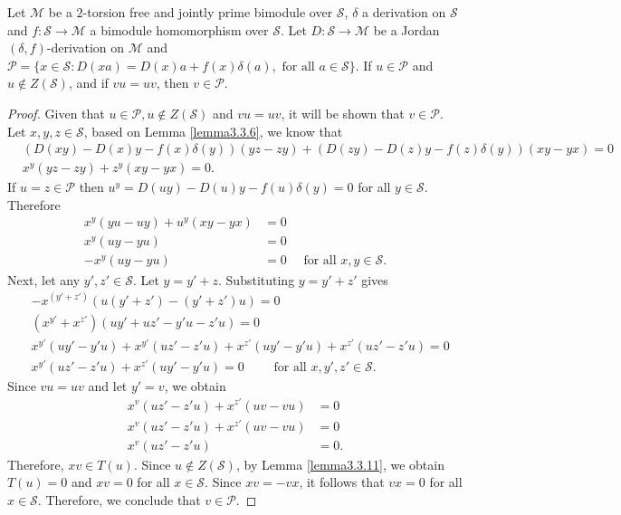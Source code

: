 \documentclass{arxiv}
\begin{document}
\begin{lemma}\label{lemma3.3.12}
    Let $\mathcal{M}$ be a $2$-torsion free and jointly prime bimodule over $\mathcal{S}$, $\delta$ a derivation on $\mathcal{S}$ and $f : \mathcal{S} \rightarrow \mathcal{M}$ a bimodule homomorphism over $\mathcal{S}$. Let $D:\mathcal{S} \rightarrow \mathcal{M}$ be a Jordan $(\delta,f)$-derivation on $\mathcal{M}$ and  $\mathcal{P}=\{ x \in \mathcal{S} : D(xa) = D(x)a+f(x)\delta(a), \text{ for all } a \in \mathcal{S}\}$. If $u \in \mathcal{P}$ and $u \notin Z(\mathcal{S})$, and if $vu=uv$, then $v \in \mathcal{P}$.
\end{lemma}
\begin{proof}
    Given that $u \in \mathcal{P}, u \notin Z(\mathcal{S})$ and $vu=uv$, it will be shown that $v \in \mathcal{P}$. Let $x,y,z \in \mathcal{S}$, based on Lemma \ref{lemma3.3.6}, we know that
    \begin{align*}
        & (D(xy)-D(x)y-f(x)\delta(y))(yz-zy)+(D(zy)-D(z)y-f(z)\delta(y))(xy-yx) = 0\\
        & x^y (yz-zy)+z^y (xy-yx)=0.
    \end{align*}
    If $u=z \in \mathcal{P}$ then $u^y = D(uy)-D(u)y -f(u)\delta(y) =0$ for all $y \in \mathcal{S}$. Therefore
    \begin{align*}
        x^y (yu-uy)+u^y(xy-yx)&=0\\
        x^y (uy-yu) &= 0 \\
        -x^y (uy-yu)&=0 \quad \text{ for all } x,y \in \mathcal{S}.
    \end{align*}
    Next, let any $y',z'\in \mathcal{S}$. Let $y=y'+z$. Substituting $y=y'+z'$ gives
    \begin{align*}
        &-x^{(y'+z')}(u(y'+z')-(y'+z')u) = 0\\
        &(x^{y'} + x^{z'})(uy'+uz'-y'u-z'u)=0\\
        &x^{y'}(uy'-y'u)+x^{y'}(uz'-z'u)+x^{z'}(uy'-y'u)+x^{z'}(uz'-z'u)=0\\
        &x^{y'}(uz'-z'u)+x^{z'}(uy'-y'u)=0 \quad \quad \text{ for all } x,y',z' \in \mathcal{S}.
    \end{align*}
    Since $vu=uv$ and let $y'=v$, we obtain
    \begin{align*}
        x^v (uz'-z'u)+x^{z'}(uv-vu) &=0\\
        x^v (uz'-z'u) + x^{z'}(uv-vu) &= 0\\
        x^v (uz'-z'u) &= 0.
    \end{align*}
    Therefore, $xv \in T(u)$. Since $u \notin Z(\mathcal{S})$, by Lemma \ref{lemma3.3.11}, we obtain $T(u) = 0$ and $xv=0$ for all $x \in \mathcal{S}$. Since $xv=-vx$, it follows that $vx=0$ for all $x \in \mathcal{S}$. Therefore, we conclude that $v \in \mathcal{P}$.
\end{proof}
\end{document}

